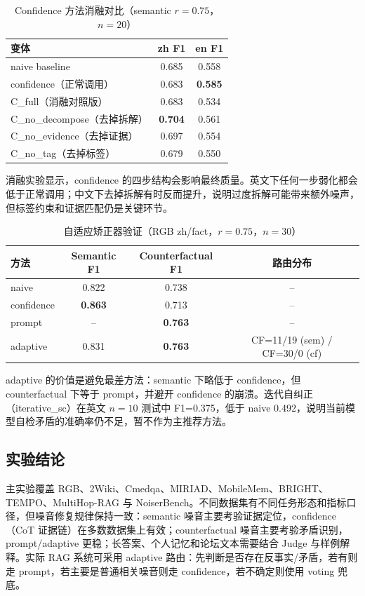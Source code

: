 \documentclass[UTF8,zihao=-4]{ctexart}
\begin{document}
\begin{table}[H]
  \centering
  \caption{Confidence 方法消融对比（semantic $r=0.75$，$n=20$）}
  \begin{tabular}{lcc}
    \toprule
    变体 & zh F1 & en F1 \\
    \midrule
    naive baseline & 0.685 & 0.558 \\
    confidence（正常调用） & 0.683 & \textbf{0.585} \\
    C\_full（消融对照版） & 0.683 & 0.534 \\
    C\_no\_decompose（去掉拆解） & \textbf{0.704} & 0.561 \\
    C\_no\_evidence（去掉证据）& 0.697 & 0.554 \\
    C\_no\_tag（去掉标签）& 0.679 & 0.550 \\
    \bottomrule
  \end{tabular}
\end{table}

消融实验显示，confidence 的四步结构会影响最终质量。英文下任何一步弱化都会低于正常调用；中文下去掉拆解有时反而提升，说明过度拆解可能带来额外噪声，但标签约束和证据匹配仍是关键环节。

\begin{table}[H]
  \centering
  \caption{自适应矫正器验证（RGB zh/fact，$r=0.75$，$n=30$）}
  \begin{tabular}{lccc}
    \toprule
    方法 & Semantic F1 & Counterfactual F1 & 路由分布 \\
    \midrule
    naive & 0.822 & 0.738 & -- \\
    confidence & \textbf{0.863} & 0.713 & -- \\
    prompt & -- & \textbf{0.763} & -- \\
    adaptive & 0.831 & \textbf{0.763} & CF=11/19 (sem) / CF=30/0 (cf) \\
    \bottomrule
  \end{tabular}
\end{table}

adaptive 的价值是避免最差方法：semantic 下略低于 confidence，但 counterfactual 下等于 prompt，并避开 confidence 的崩溃。迭代自纠正（iterative\_sc）在英文 $n=10$ 测试中 F1=0.375，低于 naive 0.492，说明当前模型自检矛盾的准确率仍不足，暂不作为主推荐方法。

\subsection{实验结论}

主实验覆盖 RGB、2Wiki、Cmedqa、MIRIAD、MobileMem、BRIGHT、TEMPO、MultiHop-RAG 与 NoiserBench。不同数据集有不同任务形态和指标口径，但噪音修复规律保持一致：semantic 噪音主要考验证据定位，confidence（CoT 证据链）在多数数据集上有效；counterfactual 噪音主要考验矛盾识别，prompt/adaptive 更稳；长答案、个人记忆和论坛文本需要结合 Judge 与样例解释。实际 RAG 系统可采用 adaptive 路由：先判断是否存在反事实/矛盾，若有则走 prompt，若主要是普通相关噪音则走 confidence，若不确定则使用 voting 兜底。
\end{document}
